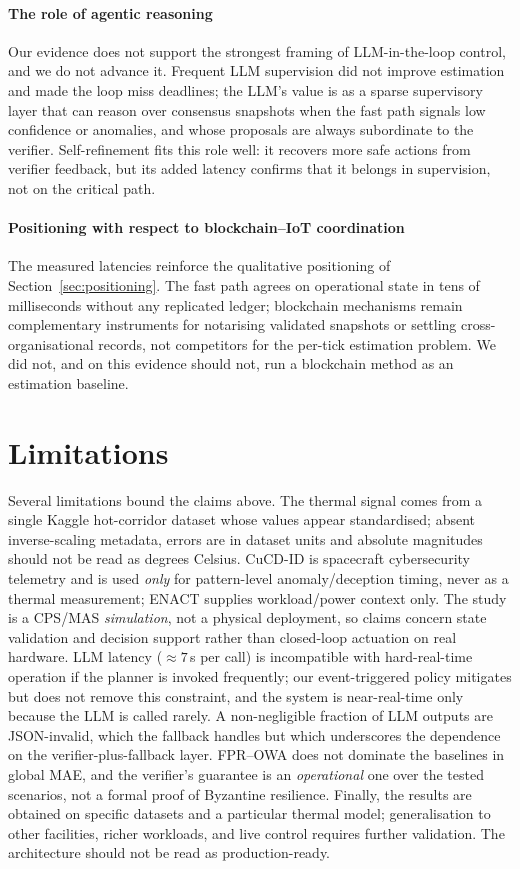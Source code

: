 \paragraph{The role of agentic reasoning}
Our evidence does not support the strongest framing of LLM-in-the-loop
control, and we do not advance it. Frequent LLM supervision did not
improve estimation and made the loop miss deadlines; the LLM's value is
as a sparse supervisory layer that can reason over consensus snapshots
when the fast path signals low confidence or anomalies, and whose
proposals are always subordinate to the verifier. Self-refinement fits
this role well: it recovers more safe actions from verifier feedback, but
its added latency confirms that it belongs in supervision, not on the
critical path.

\paragraph{Positioning with respect to blockchain--IoT coordination}
The measured latencies reinforce the qualitative positioning of
Section~\ref{sec:positioning}. The fast path agrees on operational state
in tens of milliseconds without any replicated ledger; blockchain
mechanisms remain complementary instruments for notarising validated
snapshots or settling cross-organisational records, not competitors for
the per-tick estimation problem. We did not, and on this evidence should
not, run a blockchain method as an estimation baseline.

\section{Limitations}
\label{sec:limitations}

Several limitations bound the claims above. The thermal signal comes from
a single Kaggle hot-corridor dataset whose values appear standardised;
absent inverse-scaling metadata, errors are in dataset units and absolute
magnitudes should not be read as degrees Celsius. CuCD-ID is spacecraft
cybersecurity telemetry and is used \emph{only} for pattern-level
anomaly/deception timing, never as a thermal measurement; ENACT supplies
workload/power context only. The study is a CPS/MAS \emph{simulation},
not a physical deployment, so claims concern state validation and
decision support rather than closed-loop actuation on real hardware. LLM
latency ($\approx 7$\,s per call) is incompatible with hard-real-time
operation if the planner is invoked frequently; our event-triggered
policy mitigates but does not remove this constraint, and the system is
near-real-time only because the LLM is called rarely. A non-negligible
fraction of LLM outputs are JSON-invalid, which the fallback handles but
which underscores the dependence on the verifier-plus-fallback layer.
FPR--OWA does not dominate the baselines in global MAE, and the
verifier's guarantee is an \emph{operational} one over the tested
scenarios, not a formal proof of Byzantine resilience. Finally, the
results are obtained on specific datasets and a particular thermal model;
generalisation to other facilities, richer workloads, and live control
requires further validation. The architecture should not be read as
production-ready.

